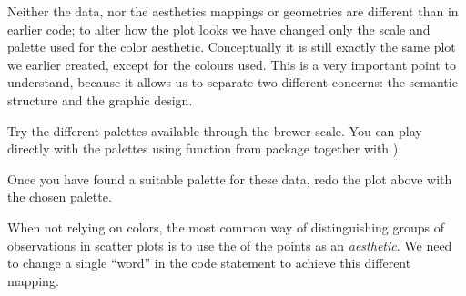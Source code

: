 \documentclass[krantz2]{krantz}\usepackage{knitr}%
\begin{document}
Neither the data, nor the aesthetics mappings or geometries are different than in earlier code; to alter how the plot looks we have changed only the scale and palette used for the color aesthetic. Conceptually it is still exactly the same plot we earlier created, except for the colours used. This is a very important point to understand, because it allows us to separate two different concerns: the semantic structure and the graphic design.

\begin{playground}
Try the different palettes available through the brewer scale. You can play directly with the palettes using function  from package  together with ).
\begin{knitrout}\footnotesize
{}\color{fgcolor}\begin{kframe}
\begin{alltt}
\hlstd{(}\hlstd{()(}\hlstd{))}
\hlstd{(}\hlstd{(} \hlstd{=} \hlstd{,}  \hlstd{=} \hlstd{,}  \hlstd{=} \hlstd{)(}\hlstd{))}
\end{alltt}
\end{kframe}
\end{knitrout}
Once you have found a suitable palette for these data, redo the plot above with the chosen palette.
\end{playground}

When not relying on colors, the most common way of distinguishing groups of observations in scatter plots is to use the  of the points as an \emph{aesthetic}. We need to change a single ``word'' in the code statement to achieve this different mapping.

\begin{knitrout}\footnotesize
{}\color{fgcolor}\begin{kframe}
\begin{alltt}
\hlstd{(}  \hlstd{(}     \hlstd{=}  \hlopt{+}
  \hlstd{()}
\end{alltt}
\end{kframe}
\end{knitrout}
\end{document}
